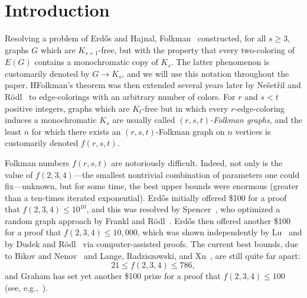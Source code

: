 \documentclass[A4paper,reqno,oneside,12pt]{amsart}
\theoremstyle{plain}
\theoremstyle{definition}
\begin{document}
\section{Introduction}
\label{section: intro}

Resolving a problem of Erd\H{o}s and Hajnal, Folkman~\cite{F70} constructed, for all $s \geq 3$, graphs $G$ which are $K_{s+1}$-free, but with the property that every two-coloring of $E(G)$ contains a monochromatic copy of $K_s$.
The latter phenomenon is customarily denoted by $G \longrightarrow K_s$, and we will use this notation throughout the paper.
HFolkman's theorem was then extended several years later by Ne\v{s}et\v{r}il and R\"odl~\cite{NR77} to edge-colorings with an arbitrary number of colors.
For $r$ and $s < t$ positive integers, graphs which are $K_t$-free but in which every $r$-edge-coloring induces a monochromatic $K_s$ are usually called {\it $(r, s, t)$-Folkman graphs}, and the least $n$ for which there exists an $(r,s,t)$-Folkman graph on $n$ vertices is customarily denoted $f(r,s,t)$.

Folkman numbers $f(r,s,t)$ are notoriously difficult.
Indeed, not only is the value of $f(2,3,4)$---the smallest nontrivial combination of parameters one could fix---unknown, but for some time, the best upper bounds were enormous (greater than a ten-times iterated exponential).
Erd\H{o}s initially offered \$100 for a proof that $f(2,3,4) \leq 10^{10}$, and this was resolved by Spencer~\cite{S88}, who optimized a random graph approach by Frankl and R\"odl~\cite{FR86}.
Erd\H{o}s then offered another \$100 for a proof that $f(2,3,4) \leq 10,000$, which was 
shown
independently by Lu~\cite{L07} and by Dudek and R\"odl~\cite{DR08-1, DR08-2} via computer-assisted proofs.
The current best bounds, due to Bikov and Nenov~\cite{BN20} and Lange, Radziszowski, and Xu~\cite{LRX14}, are still quite far apart:
\begin{equation*}
    21 \leq f(2,3,4) \leq 786,
\end{equation*}
and 
Graham has set yet another \$100 prize for a proof that $f(2,3,4) \leq 100$ 
(see, e.g.,~\cite[Problem 1.48]{G-AIM}).
\end{document}
